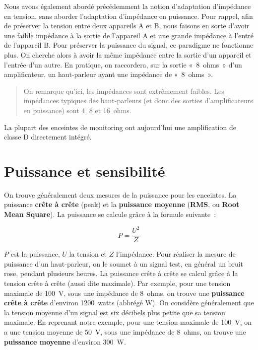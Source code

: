 \documentclass[
]{book}
\begin{document}
Nous avons également abordé précédemment la notion d'adaptation d'impédance en tension, sans aborder l'adaptation d'impédance en puissance. Pour rappel, afin de préserver la tension entre deux appareils A et B, nous faisons en sorte d'avoir une faible impédance à la sortie de l'appareil A et une grande impédance à l'entré de l'appareil B. Pour préserver la puissance du signal, ce paradigme ne fonctionne plus. On cherche alors à avoir la même impédance entre la sortie d'un appareil et l'entrée d'un autre. En pratique, on raccordera, sur la sortie «~8~ohms~» d'un amplificateur, un haut-parleur ayant une impédance de «~8~ohms~».

\begin{quote}
On remarque qu'ici, les impédances sont extrêmement faibles. Les impédances typiques des haut-parleurs (et donc des sorties d'amplificateurs en puissance) sont 4, 8 et 16~ohms.
\end{quote}

La plupart des enceintes de monitoring ont aujourd'hui une amplification de classe D directement intégré.

\hypertarget{puissance-et-sensibilituxe9}{%
\section{Puissance et sensibilité}\label{puissance-et-sensibilituxe9}}

On trouve généralement deux mesures de la puissance pour les enceintes. La puissance \textbf{crête à crête} (peak) et la \textbf{puissance moyenne} (\textbf{RMS}, ou \textbf{Root Mean Square}). La puissance se calcule grâce à la formule suivante~:

\[ P =\frac {U^2}{Z} \]

\(P\) est la puissance, \(U\) la tension et \(Z\) l'impédance. Pour réaliser la mesure de puissance d'un haut-parleur, on le soumet à un signal test, en général un bruit rose, pendant plusieurs heures. La puissance crête à crête se calcul grâce à la tension crête à crête (aussi dite maximale). Par exemple, pour une tension maximale de 100~V, sous une impédance de 8~ohms, on trouve une \textbf{puissance crête à crête} d'environ 1200~watts (abbrégé W). On considère généralement que la tension moyenne d'un signal est six décibels plus petite que sa tension maximale. En reprenant notre exemple, pour une tension maximale de 100~V, on a une tension moyenne de 50~V, sous une impédance de 8~ohms, on trouve une \textbf{puissance moyenne} d'environ 300~W.
\end{document}
